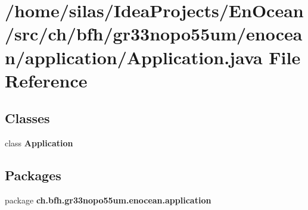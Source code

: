 \section{/home/silas/\+Idea\+Projects/\+En\+Ocean/src/ch/bfh/gr33nopo55um/enocean/application/\+Application.java File Reference}
\label{Application_8java}
\subsection*{Classes}
\begin{DoxyCompactItemize}
\item 
class {\bf Application}
\end{DoxyCompactItemize}
\subsection*{Packages}
\begin{DoxyCompactItemize}
\item 
package {\bf ch.\+bfh.\+gr33nopo55um.\+enocean.\+application}
\end{DoxyCompactItemize}
